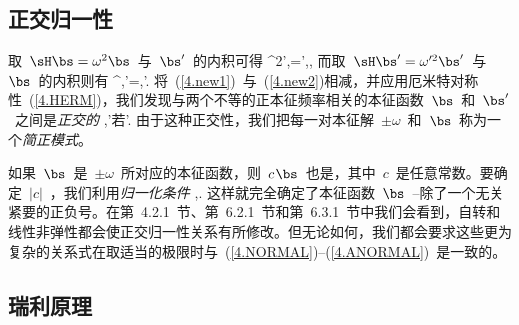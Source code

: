 \subsection{正交归一性}
%

取~$\sH\bs=\omega^2\bs$~与~$\bs'$~的内积可得
\eq
\label{4.new1}
\omega^2\langle\bs',\bs\rangle=\langle\bs',\sH\bs\rangle,
\en
而取~$\sH\bs'=\omega^{\prime 2}\bs'$~与~$\bs$~的内积则有
\eq
\label{4.new2}
\omega^{}\langle\bs,\bs'\rangle=\langle\bs,\sH\bs'\rangle.
\en
将~(\ref{4.new1})~与~(\ref{4.new2})相减，并应用厄米特对称性~(\ref{4.HERM})，我们发现与两个不等的正本征频率相关的本征函数~$\bs$~和~$\bs'$~之间是{\em 正交的\/}
\eq
\label{4.NORMAL}
\langle\bs,\bs'\quad\mbox{若}\quad\omega\neq\omega'.
\en 
由于这种正交性，我们把每一对本征解~$\pm\omega$~和~$\bs$~称为一个{\em 简正模式}。
%

如果~$\bs$~是~$\pm\omega$~所对应的本征函数，则~$c\hspace{0.3 mm}\bs$~也是，其中~$c$~是任意常数。要确定~$|c|$~，我们利用{\em 归一化条件\/}
\eq
\label{4.ANORMAL}
\langle\bs,\bs{}.
\en
这样就完全确定了本征函数~$\bs$~--除了一个无关紧要的正负号。在第~4.2.1~节、第~6.2.1~节和第~6.3.1~节中我们会看到，自转和线性非弹性都会使正交归一性关系有所修改。但无论如何，我们都会要求这些更为复杂的关系式在取适当的极限时与~(\ref{4.NORMAL})--(\ref{4.ANORMAL})~是一致的。
%

\subsection{瑞利原理}
%
%
%
\label{4.sec.Rayprin}

